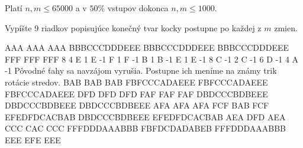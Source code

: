 \smallskip

Platí $n,m \leq 65000$
a v $50\%$ vstupov dokonca
$n,m \leq 1000$.


Vypíšte 9 riadkov popisujúce konečný tvar kocky
postupne po každej z $m$ zmien.


\sampleIN
AAA
AAA
AAA
BBBCCCDDDEEE
BBBCCCDDDEEE
BBBCCCDDDEEE
FFF
FFF
FFF
8 4
E 1
E -1
F 1
F -1
B 1
B -1
E 1
E -1
8 C -1
2 C -1
6 D -1
4 A -1
\sampleCOMMENT
Pôvodné ťahy sa navzájom vyrušia.
Postupne ich meníme na známy trik
rotácie stredov.
\sampleOUT
BAB
BAB
BAB
FBFCCCADAEEE
FBFCCCADAEEE
FBFCCCADAEEE
DFD
DFD
DFD
FAF
FAF
FAF
DBDCCCBDBEEE
DBDCCCBDBEEE
DBDCCCBDBEEE
AFA
AFA
AFA
FCF
BAB
FCF
EFEDFDCACBAB
DBDCCCBDBEEE
EFEDFDCACBAB
AEA
DFD
AEA
CCC
CAC
CCC
FFFDDDAAABBB
FBFDCDADABEB
FFFDDDAAABBB
EEE
EFE
EEE
\sampleEND



